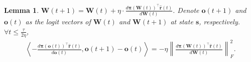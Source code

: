 \documentclass[10pt]{article}
\def\rvo{{\mathbf{o}}}
\def\rvr{{\mathbf{r}}}
\def\rvs{{\mathbf{s}}}
\def\rvo{{\mathbf{o}}}
\newtheorem{lem}{Lemma}
\def\rvpi{{\boldsymbol{\pi}}}
\def\rmW{{\mathbf{W}}}
\begin{document}
\begin{lem}
\label{lem:inner_product_logit_difference_logit_derivative}
    $\rmW(t+1) = \rmW(t) + \eta \cdot \frac{d \rvpi\left(\rmW(t)\right)^\top \hat{\rvr}\left(t\right)}{d \rmW(t)}$. Denote $\rvo(t+1)$ and $\rvo(t)$ as the logit vectors of $\rmW(t)$ and $\rmW(t+1)$ at state $\rvs$, respectively. $\forall t \le \frac{\tau}{ 2 \eta }$,
\begin{equation*}
\begin{split}
    \left\langle - \frac{d \rvpi\left( \rvo(t) \right)^\top \hat{\rvr}\left(t\right)}{d \rvo(t)}, \rvo(t+1) - \rvo(t) \right\rangle = - \eta \left\| \frac{d \rvpi\left(\rmW(t)\right)^\top \hat{\rvr}\left(t\right)}{d \rmW(t)} \right\|_F^2.
\end{split}
\end{equation*}
\end{lem}
\end{document}
